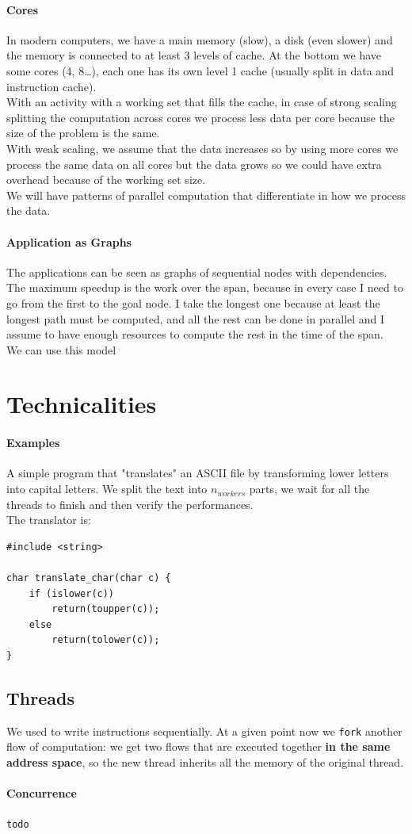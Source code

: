 \documentclass[10pt]{report}
\begin{document}
\paragraph{Cores} In modern computers, we have a main memory (slow), a disk (even slower) and the memory is connected to at least 3 levels of cache. At the bottom we have some cores (4, 8\ldots), each one has its own level 1 cache (usually split in data and instruction cache).\\
With an activity with a working set that fills the cache, in case of strong scaling splitting the computation across cores we process less data per core because the size of the problem is the same.\\
With weak scaling, we assume that the data increases so by using more cores we process the same data on all cores but the data grows so we could have extra overhead because of the working set size.\\
We will have patterns of parallel computation that differentiate in how we process the data.
\paragraph{Application as Graphs} The applications can be seen as graphs of sequential nodes with dependencies.
The maximum speedup is the work over the span, because in every case I need to go from the first to the goal node. I take the longest one because at least the longest path must be computed, and all the rest can be done in parallel and I assume to have enough resources to compute the rest in the time of the span.\\
We can use this model %
\section{Technicalities}
\paragraph{Examples}
A simple program that "translates" an ASCII file by transforming lower letters into capital letters. We split the text into $n_{workers}$ parts, we wait for all the threads to finish and then verify the performances.
\\The translator is:
\begin{lstlisting}[style=myPython]
#include <string>

char translate_char(char c) {
	if (islower(c))
		return(toupper(c));
	else
		return(tolower(c));
}
\end{lstlisting}
\subsection{Threads}
We used to write instructions sequentially. At a given point now we \texttt{fork} another flow of computation: we get two flows that are executed together \textbf{in the same address space}, so the new thread inherits all the memory of the original thread.
\paragraph{Concurrence} \texttt{todo} %
\end{document}
